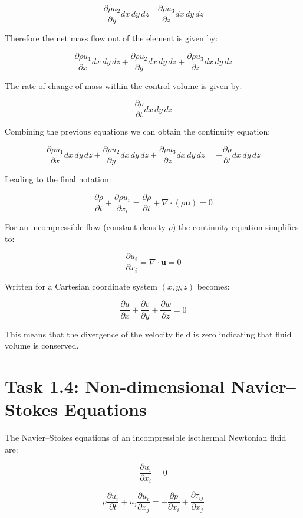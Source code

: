 \documentclass{article}
\begin{document}
\[
\frac{\partial \rho u_2}{\partial y} dx \, dy \, dz \quad \frac{\partial \rho u_3}{\partial z} dx \, dy \, dz
\]

Therefore the net mass flow out of the element is given by:

\[
\frac{\partial \rho u_1}{\partial x} dx \, dy \, dz + \frac{\partial \rho u_2}{\partial y} dx \, dy \, dz + \frac{\partial \rho u_3}{\partial z} dx \, dy \, dz
\]

The rate of change of mass within the control volume is given by:

\[
\frac{\partial \rho}{\partial t} dx \, dy \, dz
\]

Combining the previous equations we can obtain the continuity equation:

\[
\frac{\partial \rho u_1}{\partial x} dx \, dy \, dz + \frac{\partial \rho u_2}{\partial y} dx \, dy \, dz + \frac{\partial \rho u_3}{\partial z} dx \, dy \, dz = - \frac{\partial \rho}{\partial t} dx \, dy \, dz
\]

Leading to the final notation:

\[
\frac{\partial \rho}{\partial t} + \frac{\partial \rho u_i}{\partial x_i} = \frac{\partial \rho}{\partial t} + \nabla \cdot (\rho \mathbf{u}) = 0
\]

For an incompressible flow (constant density $\rho$) the continuity equation simplifies to:

\[
\frac{\partial u_i}{\partial x_i} = \nabla \cdot \mathbf{u} = 0
\]

Written for a Cartesian coordinate system $(x, y, z)$ becomes:

\[
\frac{\partial u}{\partial x} + \frac{\partial v}{\partial y} + \frac{\partial w}{\partial z} = 0
\]

This means that the divergence of the velocity field is zero indicating that fluid volume is conserved.

\section*{Task 1.4: Non-dimensional Navier–Stokes Equations}

The Navier–Stokes equations of an incompressible isothermal Newtonian fluid are:

\[
\frac{\partial u_i}{\partial x_i} = 0
\]

\[
\rho \frac{\partial u_i}{\partial t} + u_j \frac{\partial u_i}{\partial x_j} = - \frac{\partial p}{\partial x_i} + \frac{\partial \tau_{ij}}{\partial x_j}
\]
\end{document}
